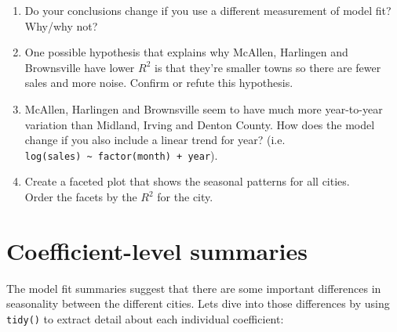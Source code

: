 \begin{enumerate}
\def\labelenumi{\arabic{enumi}.}
\item
  Do your conclusions change if you use a different measurement of model
  fit? Why/why not?
\item
  One possible hypothesis that explains why McAllen, Harlingen and
  Brownsville have lower \(R^2\) is that they're smaller towns so there
  are fewer sales and more noise. Confirm or refute this hypothesis.
\item
  McAllen, Harlingen and Brownsville seem to have much more year-to-year
  variation than Midland, Irving and Denton County. How does the model
  change if you also include a linear trend for year? (i.e.
  \texttt{log(sales)\ \textasciitilde{}\ factor(month)\ +\ year}).
\item
  Create a faceted plot that shows the seasonal patterns for all
  cities.\\
  Order the facets by the \(R^2\) for the city.
\end{enumerate}

\section{Coefficient-level summaries}

The model fit summaries suggest that there are some important
differences in seasonality between the different cities. Lets dive into
those differences by using \texttt{tidy()} to extract detail about each
individual coefficient: 

\begin{Shaded}
\end{Shaded}

